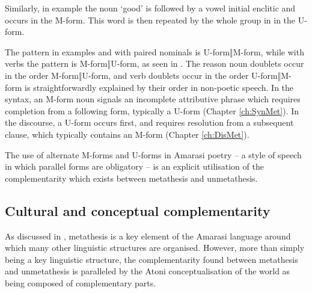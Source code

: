 Similarly, in example  the noun  `good'
is followed by a vowel initial enclitic and occurs in the M-form.
This word is then repeated by the whole group in  in the U-form.

\begin{exe}
	\label{ex:140726 2}
	\begin{xlist}
		\label{ex:areokt}
		\label{ex:arekot}
	\end{xlist}
\end{exe}

The pattern in examples  and 
with paired nominals is U-form‖M-form, while with verbs
the pattern is M-form‖U-form, as seen in .
The reason noun doublets occur in the order M-form‖U-form,
and verb doublets occur in the order U-form‖M-form
is straightforwardly explained by their order in non-poetic speech.
In the syntax, an M-form noun signals an incomplete attributive
phrase which requires completion from a following form, typically a U-form (Chapter \ref{ch:SynMet}).
In the discourse, a U-form occurs first, and requires resolution
from a subsequent clause, which typically contains an M-form (Chapter \ref{ch:DisMet}).

The use of alternate M-forms and U-forms in Amarasi poetry
-- a style of speech in which parallel forms are obligatory --
is an explicit utilisation of the complementarity which
exists between metathesis and unmetathesis.

\subsection{Cultural and conceptual complementarity}
As discussed in , metathesis is a key
element of the Amarasi language around which many other linguistic structures are organised.
However, more than simply being a key linguistic structure,
the complementarity found between metathesis and unmetathesis
is paralleled by the Atoni conceptualisation of the world
as being composed of complementary parts.

